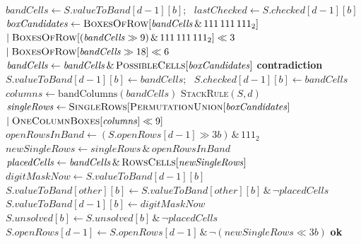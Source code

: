 \documentclass[11pt]{article}
\theoremstyle{definition}
\theoremstyle{plain}
\let\origtextsc\textsc
\renewcommand{\textsc}[1]{\textup{\origtextsc{#1}}}
\begin{document}
\begin{algorithm}[t]
\caption{\textsc{UpdateBand}$_b(S, d)$: band rule, stack rule and row singles for digit $d$ in band $b$}
\label{alg:band}
\begin{algorithmic}[1]
\State $\mathit{bandCells} \gets S.\mathit{valueToBand}[d-1][b]$; \ $\mathit{lastChecked} \gets S.\mathit{checked}[d-1][b]$
\State $\mathit{boxCandidates} \gets \textsc{BoxesOfRow}[\mathit{bandCells} \,\&\, 111\,111\,111_2]$
  \Statex \hspace{\algorithmicindent}\hspace{\algorithmicindent}$\mid \textsc{BoxesOfRow}[(\mathit{bandCells}\gg 9)\,\&\,111\,111\,111_2]\ll 3$
  \Statex \hspace{\algorithmicindent}\hspace{\algorithmicindent}$\mid \textsc{BoxesOfRow}[\mathit{bandCells}\gg 18]\ll 6$ 
\State $\mathit{bandCells} \gets \mathit{bandCells} \,\&\, \textsc{PossibleCells}[\mathit{boxCandidates}]$ 
 \Return \textbf{contradiction} \EndIf
\State $S.\mathit{valueToBand}[d-1][b] \gets \mathit{bandCells}$; \ $S.\mathit{checked}[d-1][b] \gets \mathit{bandCells}$
\State $\mathit{columns} \gets \mathrm{bandColumns}(\mathit{bandCells})$
 \textsc{StackRule}$(S, d)$ \EndIf
\State $\mathit{singleRows} \gets \textsc{SingleRows}[\textsc{PermutationUnion}[\mathit{boxCandidates}]$
  \Statex \hspace{\algorithmicindent}\hspace{\algorithmicindent}$\mid \textsc{OneColumnBoxes}[\mathit{columns}]\ll 9]$
\State $\mathit{openRowsInBand} \gets (S.\mathit{openRows}[d-1] \gg 3b) \,\&\, 111_2$ 
  \Statex \hspace{\algorithmicindent}$\mathit{newSingleRows} \gets \mathit{singleRows} \,\&\, \mathit{openRowsInBand}$
  \State $\mathit{placedCells} \gets \mathit{bandCells} \,\&\, \textsc{RowsCells}[\mathit{newSingleRows}]$ 
  \State $\mathit{digitMaskNow} \gets S.\mathit{valueToBand}[d-1][b]$ 
   $S.\mathit{valueToBand}[\mathit{other}][b] \gets S.\mathit{valueToBand}[\mathit{other}][b] \,\&\, \lnot\mathit{placedCells}$ \EndFor
  \State $S.\mathit{valueToBand}[d-1][b] \gets \mathit{digitMaskNow}$ 
  \State $S.\mathit{unsolved}[b] \gets S.\mathit{unsolved}[b] \,\&\, \lnot\mathit{placedCells}$
  \Statex \hspace{\algorithmicindent}$S.\mathit{openRows}[d-1] \gets S.\mathit{openRows}[d-1] \,\&\, \lnot(\mathit{newSingleRows}\ll 3b)$
\EndIf
\State \Return \textbf{ok}
\end{algorithmic}
\end{algorithm}
\end{document}
